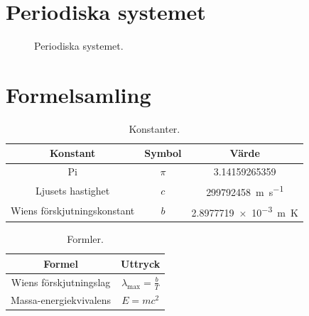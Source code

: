 \section{Periodiska systemet}
\vfill
\begin{figure}[h!]
    \centering

    \caption{Periodiska systemet.}
\end{figure}
\vfill
\pagebreak

\section{Formelsamling}
\centering
\begin{table}[h!]
    \def\arraystretch{1.5}
    \centering
    \begin{tabular}{c | c | c}
        \textbf{Konstant} & \textbf{Symbol} & \textbf{Värde} \\ \midrule
        Pi & $\pi$ & \num{3.14159265359} \\
        Ljusets hastighet & $c$ & \SI{299792458}{\m\per\s} \\
        Wiens förskjutningskonstant & $b$ & \SI{2.8977719e-3}{\m\kelvin}
    \end{tabular}
    \caption{Konstanter.}
\end{table}

\begin{table}[h!]
    \def\arraystretch{1.5}
    \centering
    \begin{tabular}{c | c}
        \textbf{Formel} & \textbf{Uttryck} \\ \midrule
        Wiens förskjutningslag & $\displaystyle \lambda_\text{max} = \frac{b}{T}$ \\
        Massa-energiekvivalens & $\displaystyle E = mc^2$
    \end{tabular}
    \caption{Formler.}
\end{table}